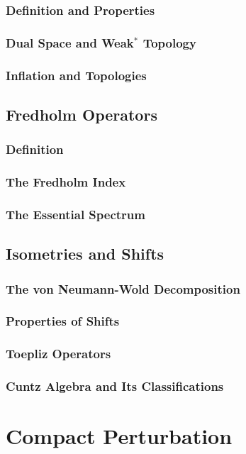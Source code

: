 \documentclass[a4paper, 11pt]{report}
\begin{document}
	\subsection{Definition and Properties}
	\subsection{Dual Space and Weak$^*$ Topology}
	\subsection{Inflation and Topologies}

	\section{Fredholm Operators}
	\subsection{Definition}
	\subsection{The Fredholm Index}
	\subsection{The Essential Spectrum}

	\section{Isometries and Shifts}
	\subsection{The von Neumann-Wold Decomposition}
	\subsection{Properties of Shifts}
	\subsection{Toepliz Operators}
	\subsection{Cuntz Algebra and Its Classifications}


	\chapter{Compact Perturbation}
\end{document}
